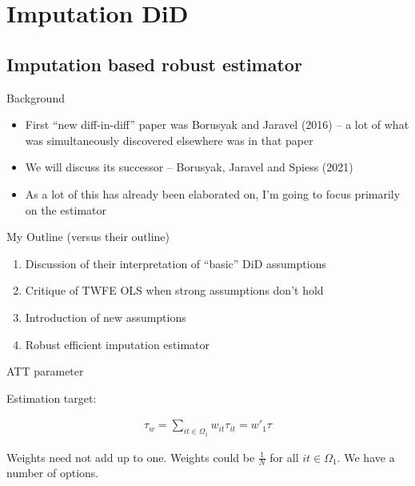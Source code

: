 \documentclass{beamer}
\begin{document}



\section{Imputation DiD}

\subsection{Imputation based robust estimator}



\begin{frame}{Background}

\begin{itemize}
\item First ``new diff-in-diff'' paper was Borusyak and Jaravel (2016) -- a lot of what was simultaneously discovered elsewhere was in that paper
\item We will discuss its successor -- Borusyak, Jaravel and Spiess (2021)
\item As a lot of this has already been elaborated on, I'm going to focus primarily on the estimator
\end{itemize}

\end{frame}

\begin{frame}{My Outline (versus their outline)}

\begin{enumerate}
\item Discussion of their interpretation of ``basic'' DiD assumptions
\item Critique of TWFE OLS when strong assumptions don't hold
\item Introduction of new assumptions
\item Robust efficient imputation estimator
\end{enumerate}

\end{frame}


\begin{frame}{ATT parameter}

Estimation target:

\begin{eqnarray*}
\tau_w = \sum_{it \in \Omega_{1}}w_{it}\tau_{it} = w'_1\tau
\end{eqnarray*}

\bigskip

Weights need not add up to one.  Weights could be $\frac{1}{N}$ for all $it \in \Omega_1$. We have a number of options. 


\end{frame}
\end{document}
